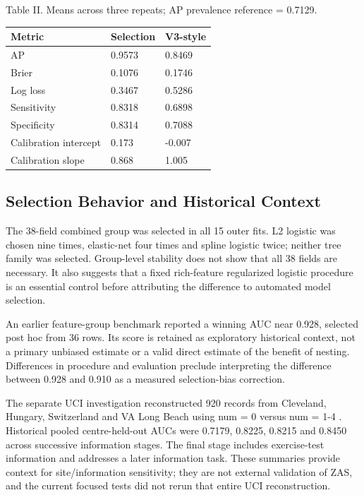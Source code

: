 \documentclass[conference]{IEEEtran}
\begin{document}
Table II. Means across three repeats; AP prevalence reference = 0.7129.

\begin{center}\footnotesize
\begin{tabular}{p{}p{}p{}}
\hline
Metric & Selection & V3-style \\
\hline
AP & 0.9573 & 0.8469 \\
Brier & 0.1076 & 0.1746 \\
Log loss & 0.3467 & 0.5286 \\
Sensitivity & 0.8318 & 0.6898 \\
Specificity & 0.8314 & 0.7088 \\
Calibration intercept & 0.173 & -0.007 \\
Calibration slope & 0.868 & 1.005 \\
\hline
\end{tabular}
\end{center}
\subsection{Selection Behavior and Historical Context}
The 38-field combined group was selected in all 15 outer fits. L2 logistic was chosen nine times, elastic-net four times and spline logistic twice; neither tree family was selected. Group-level stability does not show that all 38 fields are necessary. It also suggests that a fixed rich-feature regularized logistic procedure is an essential control before attributing the difference to automated model selection.

An earlier feature-group benchmark reported a winning AUC near 0.928, selected post hoc from 36 rows. Its score is retained as exploratory historical context, not a primary unbiased estimate or a valid direct estimate of the benefit of nesting. Differences in procedure and evaluation preclude interpreting the difference between 0.928 and 0.910 as a measured selection-bias correction.

The separate UCI investigation reconstructed 920 records from Cleveland, Hungary, Switzerland and VA Long Beach using num = 0 versus num = 1-4 \cite{r4}. Historical pooled centre-held-out AUCs were 0.7179, 0.8225, 0.8215 and 0.8450 across successive information stages. The final stage includes exercise-test information and addresses a later information task. These summaries provide context for site/information sensitivity; they are not external validation of ZAS, and the current focused tests did not rerun that entire UCI reconstruction.
\end{document}
